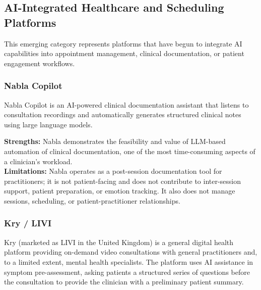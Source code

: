 \subsection{AI-Integrated Healthcare and Scheduling Platforms}
\label{subsec:ai-health}

This emerging category represents platforms that have begun to integrate AI
capabilities into appointment management, clinical documentation, or patient
engagement workflows.

\subsubsection{Nabla Copilot}

Nabla Copilot is an AI-powered clinical documentation assistant that listens to
consultation recordings and automatically generates structured clinical notes
using large language models.

\begin{tcolorbox}[colback=lightgray, colframe=accentblue, title=\textbf{Nabla Copilot — Assessment}, fonttitle=\bfseries, sharp corners=south]
  \textbf{Strengths:} Nabla demonstrates the feasibility and value of
  LLM-based automation of clinical documentation, one of the most time-consuming
  aspects of a clinician's workload. \\[4pt]
  \textbf{Limitations:} Nabla operates as a post-session documentation tool for
  practitioners; it is not patient-facing and does not contribute to inter-session
  support, patient preparation, or emotion tracking. It also does not manage
  sessions, scheduling, or patient-practitioner relationships.
\end{tcolorbox}

\subsubsection{Kry / LIVI}

Kry (marketed as LIVI in the United Kingdom) is a general digital health platform
providing on-demand video consultations with general practitioners and, to a
limited extent, mental health specialists. The platform uses AI assistance in
symptom pre-assessment, asking patients a structured series of questions before
the consultation to provide the clinician with a preliminary patient summary.

